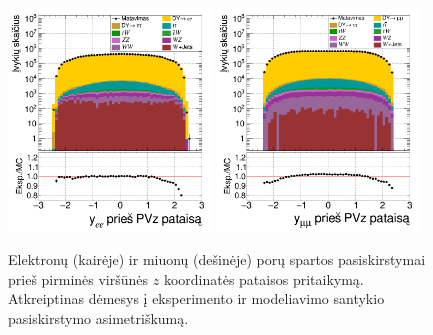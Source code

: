 \documentclass[a4paper, 12pt, twoside]{article}
\begin{document}
\begin{figure}[tbp]
	\includegraphics[width=0.48\textwidth]{ee_rapi_beforePVZ.png}
	\includegraphics[width=0.48\textwidth]{mumu_rapi_beforePVZ.png}
	\caption{\label{fig:rapibPVZ} Elektronų (kairėje) ir miuonų (dešinėje) porų spartos pasiskirstymai
		prieš pirminės viršūnės $z$ koordinatės pataisos pritaikymą.
		Atkreiptinas dėmesys į eksperimento ir modeliavimo santykio pasiskirstymo asimetriškumą.}
\end{figure}
\end{document}
